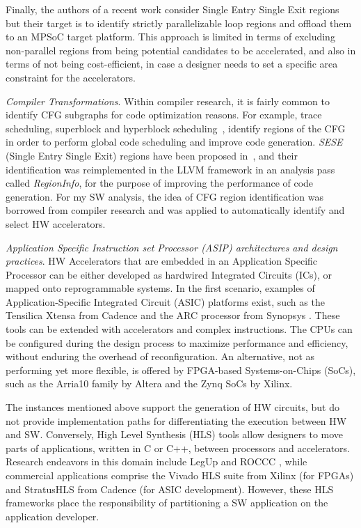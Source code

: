 \documentclass[]{usiinfthesis}
\begin{document}
Finally, the authors of a recent work \cite{AguilarJune16} consider
Single Entry Single Exit regions but their target is to identify
strictly parallelizable loop regions and offload them to an MPSoC
target platform. This approach is limited in
terms of excluding non-parallel regions from being potential
candidates to be accelerated, and also in terms of not being cost-efficient, in case a
designer needs to set a specific area constraint for the accelerators.

\emph{Compiler Transformations}.
Within compiler research, it is fairly 
common to identify CFG subgraphs for code
optimization reasons. For example, trace scheduling, superblock and
hyperblock scheduling~\cite{HankSep93}, identify regions
of the CFG in order to perform global code scheduling and
improve code generation. \emph{SESE} (Single Entry
Single Exit) regions have been proposed in~\cite{JohnsonJun94}, and
their identification was reimplemented in the LLVM framework in an 
analysis pass
called \emph{RegionInfo}, for the purpose of improving the
performance of code generation. For my SW analysis, the idea of
CFG region identification was borrowed from compiler research and was 
applied to automatically identify and select HW accelerators.

\emph{Application Specific Instruction set Processor (ASIP) architectures and design practices}.
HW Accelerators that are embedded
in an Application Specific Processor can be either developed as hardwired
Integrated Circuits (ICs), or mapped onto reprogrammable systems. In the
first scenario, examples of Application-Specific Integrated Circuit (ASIC) 
platforms exist, such as the
Tensilica Xtensa from Cadence \cite{TensilicaMar17} and the ARC
processor from Synopsys \cite{ArcDec16}. These tools can be extended with
accelerators and complex instructions. The CPUs can be configured
during the design process to maximize performance and efficiency,
without enduring the overhead of reconfiguration. An alternative, not 
as performing yet more flexible, is offered by FPGA-based
Systems-on-Chips (SoCs), such as the Arria10 family \cite{ArriaNov16} by Altera 
and the Zynq SoCs \cite{ZynqMar17} by Xilinx.\par

The instances mentioned above support the generation of HW
circuits, but do not provide implementation paths for differentiating the
execution between HW and SW. Conversely, High Level
Synthesis (HLS) tools allow designers to move parts of applications, 
written in C or C++, between processors and
accelerators. Research endeavors in this domain include LegUp
\cite{CanisSep13} and ROCCC \cite{GuoMar05}, while commercial
applications comprise the Vivado HLS \cite{VivadoHLSMar17} suite
from Xilinx (for FPGAs) and StratusHLS \cite{StratusHLSApr16} from
Cadence (for ASIC development).
However, these HLS frameworks place the responsibility of
partitioning a SW application on the application developer.\par
\end{document}
